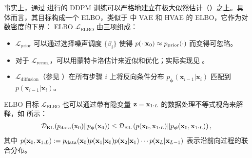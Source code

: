 事实上，通过  进行的 DDPM 训练可以严格地建立在极大似然估计（）之上。具体而言，其目标构成一个 ELBO，类似于  中 VAE 和 HVAE 的 ELBO，它作为对数密度的下界：
ELBO $\mathcal{L}_{\text{ELBO}}$ 由三项组成：
\begin{itemize}
    \item $\mathcal{L}_{\text{prior}}$ 可以通过选择噪声调度 $\{\beta_i\}$ 使得 $p(\cdot|{\mathbf{x}}_0) \approx p_{\text{prior}}(\cdot)$ 而变得可忽略。
    \item 对于 $\mathcal{L}_{\text{recon.}}$，可以用蒙特卡洛估计来近似和优化；实际实现见 \citep{ho2020denoising, kingma2021variational}。
    \item $\mathcal{L}_{\text{diffusion}}$（参见 ）在所有步骤 $i$ 上将反向条件分布 $p_{\bm{\phi}}(\mathbf{x}_{i-1}|\mathbf{x}_i)$ 匹配到 $p(\mathbf{x}_{i-1}|\mathbf{x}_i)$。
\end{itemize}

ELBO 目标 $\mathcal{L}_{\text{ELBO}}$ 也可以通过带有隐变量 ${\mathbf{z}} = {\mathbf{x}}_{1:L}$ 的数据处理不等式视角来解释，如  所示：
\begin{align*}
    \mathcal{D}_{\mathrm{KL}}(p_{\mathrm{data}}({\mathbf{x}}_0) \| p_{\bm{\phi}}({\mathbf{x}}_0)) \leq \mathcal{D}_{\mathrm{KL}}\left(p({\mathbf{x}}_0, {\mathbf{x}}_{1:L}) \| p_{\bm{\phi}}({\mathbf{x}}_0, {\mathbf{x}}_{1:L})\right),
\end{align*}
其中 $p({\mathbf{x}}_0, {\mathbf{x}}_{1:L}) := p_{\mathrm{data}}({\mathbf{x}}_0)  p({\mathbf{x}}_1|{\mathbf{x}}_0)  p({\mathbf{x}}_2|{\mathbf{x}}_1) \cdots p({\mathbf{x}}_L|{\mathbf{x}}_{L-1})$ 表示沿前向过程的联合分布。 




